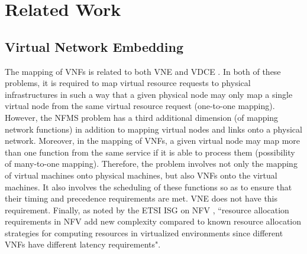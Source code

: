 \documentclass[conference]{IEEEtran}
\begin{document}
\section{Related Work}\label{related}
\subsection{Virtual Network Embedding}
The mapping of VNFs is related to both VNE \cite{Fischer13, aims} and VDCE \cite{Rabbani13}. In both of these problems, it is required to map virtual resource requests to physical infrastructures in such a way that a given physical node may only map a single virtual node from the same virtual resource request (one-to-one mapping). However, the NFMS problem has a third additional dimension (of mapping network functions) in addition to mapping virtual nodes and links onto a physical network. Moreover, in the mapping of VNFs, a given virtual node may map more than one function from the same service if it is able to process them (possibility of many-to-one mapping). Therefore, the problem involves not only the mapping of virtual machines onto physical machines, but also VNFs onto the virtual machines. It also involves the scheduling of these functions so as to ensure that their timing and precedence requirements are met. VNE does not have this requirement. Finally, as noted by the ETSI ISG on NFV \cite{ETSIDOCS}, ``resource allocation requirements in NFV add new complexity compared to known resource allocation strategies for computing resources in virtualized environments since different VNFs have different latency requirements".
\end{document}
